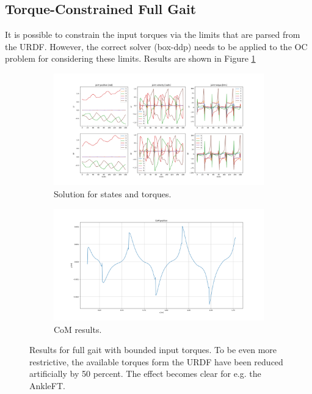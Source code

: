 \subsection{Torque-Constrained Full Gait}
It is possible to constrain the input torques via the limits that are parsed from the URDF. However, the correct solver (box-ddp) needs to be applied to the OC problem for considering these limits.  Results are shown in Figure \ref{fig:rh5_constrain_torque}
\begin{figure}[h!]
\centering
\begin{subfigure}{.8\textwidth}
  \centering
  \includegraphics[width=1\linewidth]{Media/Crocoddyl/RH5/RH5GaitUbound50Percent_Solution.png}
  \caption{Solution for states and torques.}
\end{subfigure}
\begin{subfigure}{.8\textwidth}
  \centering
\includegraphics[width=1\linewidth]{Media/Crocoddyl/RH5/RH5GaitUbound50Percent_CoM.png}
\caption{CoM results.}
\end{subfigure}
\caption{Results for full gait with bounded input torques. To be even more restrictive, the available torques form the URDF have been reduced artificially by 50 percent. The effect becomes clear for e.g. the AnkleFT.}
\label{fig:rh5_constrain_torque}
\centering
\end{figure}

